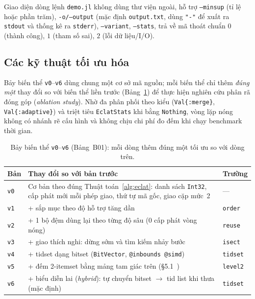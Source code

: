 Giao diện dòng lệnh \texttt{demo.jl} không dùng thư viện ngoài, hỗ trợ \texttt{--minsup} (tỉ lệ hoặc phần trăm), \texttt{-o/--output} (mặc định \texttt{output.txt}, dùng \texttt{"-"} để xuất ra \texttt{stdout} và thống kê ra \texttt{stderr}), \texttt{--variant}, \texttt{--stats}, trả về mã thoát chuẩn $0$ (thành công), $1$ (tham số sai), $2$ (lỗi dữ liệu/I/O).

\subsection{Các kỹ thuật tối ưu hóa}
\label{subsec:optimizations}

Bảy biến thể \texttt{v0}--\texttt{v6} dùng chung một cơ sở mã nguồn; mỗi biến thể chỉ thêm \emph{đúng một} thay đổi so với biến thể liền trước (Bảng~\ref{tab:b01_variants}) để thực hiện nghiên cứu phân rã đóng góp (\emph{ablation study}). Nhờ đa phân phối theo kiểu (\texttt{Val\{:merge\}}, \texttt{Val\{:adaptive\}}) và triệt tiêu \texttt{EclatStats} khi bằng \texttt{Nothing}, vòng lặp nóng không có nhánh rẽ cấu hình và không chịu chi phí đo đếm khi chạy benchmark thời gian.

\begin{table}[!t]
\centering
\caption{Bảy biến thể \texttt{v0}--\texttt{v6} (Bảng~B01): mỗi dòng thêm đúng một tối ưu so với dòng trên.}
\label{tab:b01_variants}
\scriptsize
\begin{tabular}{@{}lp{5.7cm}l@{}}
\toprule
Bản & Thay đổi so với bản trước & Trường \\
\midrule
\texttt{v0} & Cơ bản theo đúng Thuật toán~\ref{alg:eclat}: danh sách \texttt{Int32}, cấp phát mới mỗi phép giao, thứ tự mã gốc, giao cặp mức~2 & --- \\
\texttt{v1} & + sắp mục theo độ hỗ trợ tăng dần & \texttt{order} \\
\texttt{v2} & + 1 bộ đệm dùng lại theo từng độ sâu (0 cấp phát vòng nóng) & \texttt{reuse} \\
\texttt{v3} & + giao thích nghi: dừng sớm và tìm kiếm nhảy bước & \texttt{isect} \\
\texttt{v4} & + tidset dạng bitset (\texttt{BitVector}, \texttt{@inbounds @simd}) & \texttt{tidset} \\
\texttt{v5} & + đếm 2-itemset bằng mảng tam giác trên (§5.1~\cite{zaki2000scalable}) & \texttt{level2} \\
\texttt{v6} & + biểu diễn lai (\emph{hybrid}): tự chuyển bitset $\to$ tid list khi thưa (mặc định) & \texttt{tidset} \\
\bottomrule
\end{tabular}
\end{table}

